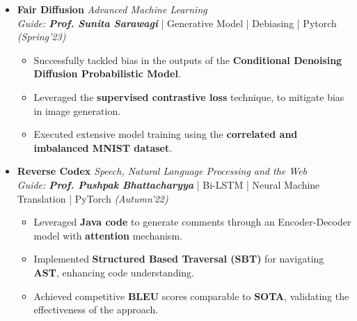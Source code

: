 \documentclass[a4paper,10.5pt]{article}
\begin{document}
\begin{itemize}[noitemsep,nolistsep]
\item \textbf{Fair Diffusion} \hfill {\emph{Advanced Machine Learning}}\\
\emph{Guide: \textbf{Prof. Sunita Sarawagi}} | Generative Model | Debiasing | Pytorch   \hfill
\emph{(Spring'23)}
\vspace{0.1cm}
\begin{itemize}[noitemsep,nolistsep]
    \item Successfully tackled bias in the outputs of the \textbf{Conditional Denoising Diffusion Probabilistic Model}.
    \vspace{0.07cm}

    \item Leveraged the \textbf{supervised contrastive loss} technique, to mitigate bias in image generation.
    \vspace{0.07cm}
    
    \item Executed extensive model training using the \textbf{correlated and imbalanced MNIST dataset}.
\end{itemize}
\vspace{0.2cm}

\item \textbf{Reverse Codex} \hfill {\emph{Speech, Natural Language Processing and the Web}}\\
\emph{Guide: \textbf{Prof. Pushpak Bhattacharyya}} | Bi-LSTM | Neural Machine Translation | PyTorch\hfill
\emph{(Autumn'22)}
\vspace{0.1cm}
\begin{itemize}[noitemsep,nolistsep]
    \item Leveraged \textbf{Java code} to generate comments through an Encoder-Decoder model with \textbf{attention} mechanism.
    \vspace{0.07cm}
    \item Implemented \textbf{Structured Based Traversal (SBT)} for navigating \textbf{AST}, enhancing code understanding.
    \vspace{0.07cm}
    \item Achieved competitive \textbf{BLEU} scores comparable to \textbf{SOTA}, validating the effectiveness of the approach.
\end{itemize}
\vspace{0.2cm}


\end{itemize}
\end{document}
